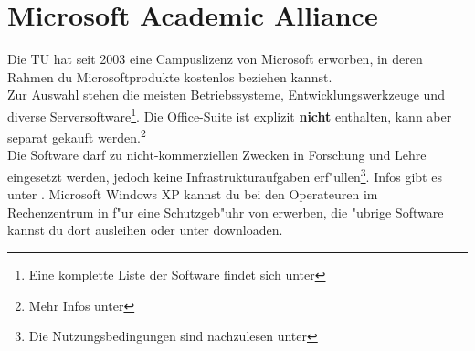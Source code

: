 \section{Microsoft Academic Alliance}

Die TU hat seit 2003 eine
Campuslizenz
von Microsoft erworben, in deren Rahmen du Microsoftprodukte kostenlos
beziehen kannst.\\
Zur Auswahl stehen die meisten Betriebssysteme, Entwicklungswerkzeuge und
diverse Serversoftware\footnote{\sloppy Eine komplette Liste der Software
findet sich unter }.
Die Office-Suite ist explizit \textbf{nicht} enthalten, kann aber separat
gekauft werden.\footnote{Mehr Infos unter
}\\
Die Software darf zu nicht-kommerziellen Zwecken in Forschung und Lehre
eingesetzt werden, jedoch keine Infrastrukturaufgaben
erf"ullen\footnote{Die Nutzungsbedingungen sind nachzulesen unter
}.
Infos gibt es unter
.
Microsoft Windows XP kannst du bei den Operateuren im Rechenzentrum in
f"ur eine Schutzgeb"uhr von  erwerben, die "ubrige Software kannst du
dort ausleihen oder unter
downloaden.